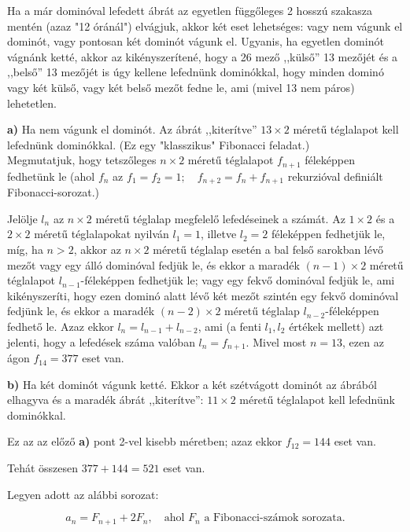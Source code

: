 \begin{solution}
Ha a már dominóval lefedett ábrát az egyetlen függőleges 2 hosszú
szakasza mentén (azaz "12 óránál") elvágjuk, akkor két eset lehetséges:
vagy nem vágunk el dominót, vagy pontosan két dominót vágunk el. Ugyanis,
ha egyetlen dominót vágnánk ketté, akkor az kikényszerítené, hogy
a 26 mező ,,külső'' 13 mezőjét és a ,,belső'' 13 mezőjét is úgy
kellene lefednünk dominókkal, hogy minden dominó vagy két külső, vagy
két belső mezőt fedne le, ami (mivel 13 nem páros) lehetetlen.

\medskip{}

\textbf{a)} Ha nem vágunk el dominót. Az ábrát ,,kiterítve'' $13\times2$
méretű téglalapot kell lefednünk dominókkal. (Ez egy "klasszikus"
Fibonacci feladat.)\\
 Megmutatjuk, hogy tetszőleges $n\times2$ méretű téglalapot $f_{n+1}$
féleképpen fedhetünk le (ahol $f_{n}$ az $f_{1}=f_{2}=1;\quad f_{n+2}=f_{n}+f_{n+1}$
rekurzióval definiált Fibonacci-sorozat.)

\medskip{}

Jelölje $l_{n}$ az $n\times2$ méretű téglalap megfelelő lefedéseinek
a számát. Az $1\times2$ és a $2\times2$ méretű téglalapokat nyilván
$l_{1}=1$, illetve $l_{2}=2$ féleképpen fedhetjük le, míg, ha $n>2$,
akkor az $n\times2$ méretű téglalap esetén a bal felső sarokban lévő
mezőt vagy egy álló dominóval fedjük le, és ekkor a maradék $(n-1)\times2$
méretű téglalapot $l_{n-1}$-féleképpen fedhetjük le; vagy egy fekvő
dominóval fedjük le, ami kikényszeríti, hogy ezen dominó alatt lévő
két mezőt szintén egy fekvő dominóval fedjünk le, és ekkor a maradék
$(n-2)\times2$ méretű téglalap $l_{n-2}$-féleképpen fedhető le.
Azaz ekkor $l_{n}=l_{n-1}+l_{n-2}$, ami (a fenti $l_{1},l_{2}$ értékek
mellett) azt jelenti, hogy a lefedések száma valóban $l_{n}=f_{n+1}$.
Mivel most $n=13$, ezen az ágon $f_{14}=377$ eset van.

\medskip{}

\textbf{b)} Ha két dominót vágunk ketté. Ekkor a két szétvágott dominót
az ábrából elhagyva és a maradék ábrát ,,kiterítve'': $11\times2$
méretű téglalapot kell lefednünk dominókkal.

\medskip{}

Ez az az előző \textbf{a)} pont 2-vel kisebb méretben; azaz ekkor
$f_{12}=144$ eset van.

\medskip{}

Tehát összesen $377+144=\boxed{521}$ eset van.
\end{solution}
\begin{extraproblem}
Legyen adott az alábbi sorozat: 

\[
a_{n}=F_{n+1}+2F_{n},\quad\text{ahol }F_{n}\text{ a Fibonacci-számok sorozata.}
\]
\end{extraproblem}

